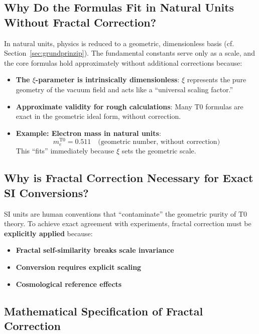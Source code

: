 	\subsection{Why Do the Formulas Fit in Natural Units Without Fractal Correction?}
	
	In natural units, physics is reduced to a geometric, dimensionless basis (cf. Section~\ref{sec:grundprinzip}). The fundamental constants serve only as a scale, and the core formulas hold approximately without additional corrections because:
	
	\begin{itemize}
		\item \textbf{The $\xi$-parameter is intrinsically dimensionless}: $\xi$ represents the pure geometry of the vacuum field and acts like a ``universal scaling factor.''
		
		\item \textbf{Approximate validity for rough calculations}: Many T0 formulas are exact in the geometric ideal form, without correction.
		
		\item \textbf{Example: Electron mass in natural units}:
		\begin{equation}
			m_e^{\mathrm{T0}} = 0.511 \quad \text{(geometric number, without correction)}
		\end{equation}
		This ``fits'' immediately because $\xi$ sets the geometric scale.
	\end{itemize}
	
	\subsection{Why is Fractal Correction Necessary for Exact SI Conversions?}
	
	SI units are human conventions that ``contaminate'' the geometric purity of T0 theory. To achieve exact agreement with experiments, fractal correction must be \textbf{explicitly applied} because:
	
	\begin{itemize}
		\item \textbf{Fractal self-similarity breaks scale invariance}
		\item \textbf{Conversion requires explicit scaling}
		\item \textbf{Cosmological reference effects}
	\end{itemize}
	
	\subsection{Mathematical Specification of Fractal Correction}
	
